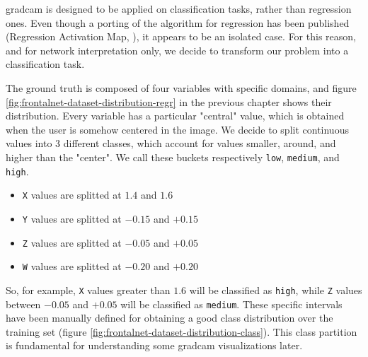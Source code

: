 \gls{gradcam} is designed to be applied on classification tasks, rather than regression ones. Even though a porting of the algorithm for regression has been published (Regression Activation Map, \cite{wang2019diabetic}), it appears to be an isolated case. For this reason, and for network interpretation only, we decide to transform our problem into a classification task.

The ground truth is composed of four variables with specific domains, and figure \ref{fig:frontalnet-dataset-distribution-regr} in the previous chapter shows their distribution. Every variable has a particular "central" value, which is obtained when the user is somehow centered in the image. We decide to split continuous values into 3 different classes, which account for values smaller, around, and higher than the "center". We call these buckets respectively \texttt{low}, \texttt{medium}, and \texttt{high}.

\begin{itemize}
	\item \texttt{X} values are splitted at $1.4$ and $1.6$
	\item \texttt{Y} values are splitted at $-0.15$ and $+0.15$
	\item \texttt{Z} values are splitted at $-0.05$ and $+0.05$
	\item \texttt{W} values are splitted at $-0.20$ and $+0.20$
\end{itemize}

So, for example, \texttt{X} values greater than $1.6$ will be classified as \texttt{high}, while \texttt{Z} values between $-0.05$ and $+0.05$ will be classified as \texttt{medium}. These specific intervals have been manually defined for obtaining a good class distribution over the training set (figure \ref{fig:frontalnet-dataset-distribution-class}). This class partition is fundamental for understanding some \gls{gradcam} visualizations later.

